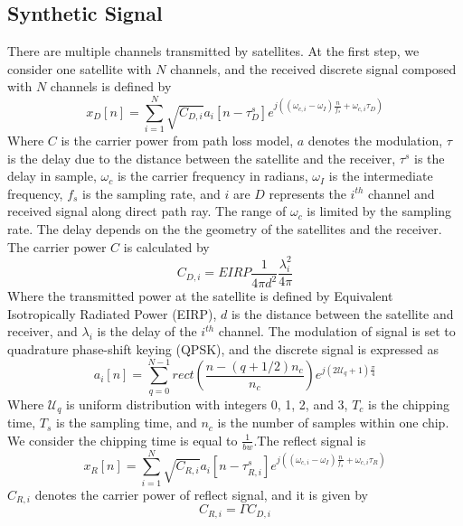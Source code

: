 \subsection{Synthetic Signal}
There are multiple channels transmitted by satellites. At the first step, we consider one satellite with $N$ channels, and the received discrete signal composed with $N$ channels is defined by
\begin{equation}
x_D[n] = \sum_{i=1}^N \sqrt{C_{D,i}} a_i [n-\tau_D^s]e^{j ((\omega_{c,i} - \omega_I) \frac{n}{f_s}+\omega_{c,i} \tau_D)}
\end{equation}
Where $C$ is the carrier power from path loss model, $a$ denotes the modulation, $\tau$ is the delay due to the distance between the satellite and the receiver, $\tau^s$ is the delay in sample, $\omega_c$ is the carrier frequency in radians, $\omega_I$ is the intermediate frequency, $f_s$ is the sampling rate, and $i$ are $D$ represents the $i^{th}$ channel and received signal along direct path ray.  The range of $\omega_c$ is limited by the sampling rate. The delay depends on the the geometry of the satellites and the receiver. The carrier power $C$ is calculated by
\begin{equation}
C_{D,i}=EIRP \frac{1}{4 \pi d^2} \frac{\lambda_i^2}{4 \pi}
\end{equation}
Where the transmitted power at the satellite is defined by Equivalent Isotropically Radiated Power (EIRP), $d$ is the distance between the satellite and receiver, and $\lambda_i$ is the delay of the $i^{th}$ channel. The modulation of signal is set to quadrature phase-shift keying (QPSK), and the discrete signal is expressed as
\begin{equation}
a_i[n] =  \sum_{q=0}^{N-1} rect (\frac{n-(q+1/2)n_c}{n_c})e^{j (2 \mathcal{U}_q +1) \frac{\pi}{4} }
\end{equation}
Where $\mathcal{U}_q$ is uniform distribution with integers 0, 1, 2, and 3,  $T_c$ is the chipping time, $T_s$ is the sampling time, and $n_c$ is the number of samples within one chip. We consider the chipping time is equal to $\frac{1}{bw}$.The reflect signal is
\begin{equation}
x_R[n] = \sum_{i=1}^N \sqrt{C_{R,i}} a_i [n-\tau_{R,i}^s]e^{j ((\omega_{c,i} - \omega_I) \frac{n}{f_s}+\omega_{c,i} \tau_{R})}
\end{equation}
$C_{R,i}$ denotes the carrier power of reflect signal, and it is given by
\begin{equation}
C_{R,i} = \Gamma C_{D,i}
\end{equation}
